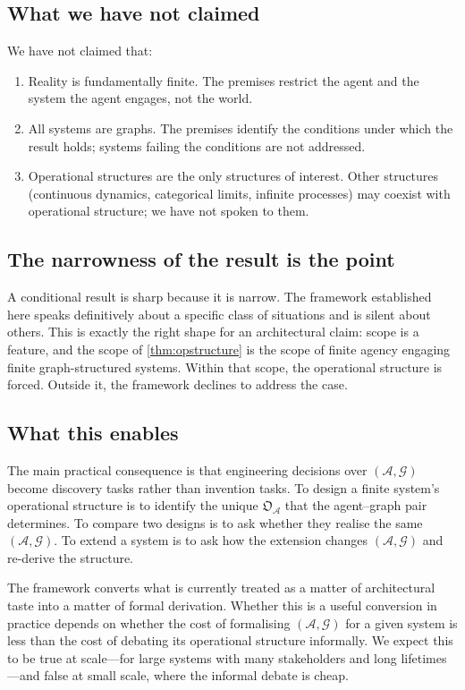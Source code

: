 \documentclass[11pt,twocolumn,a4paper]{article}
\theoremstyle{thmstyle}
\theoremstyle{definition}
\theoremstyle{remark}
\newcommand{\Graph}{\mathcal{G}}
\newcommand{\Agent}{\mathcal{A}}
\newcommand{\OpStr}{\mathfrak{O}}
\begin{document}
\subsection{What we have not claimed}

We have not claimed that:
\begin{enumerate}[nosep,leftmargin=*]
\item Reality is fundamentally finite. The premises restrict the
agent and the system the agent engages, not the world.
\item All systems are graphs. The premises identify the conditions
under which the result holds; systems failing the conditions are
not addressed.
\item Operational structures are the only structures of interest.
Other structures (continuous dynamics, categorical limits, infinite
processes) may coexist with operational structure; we have not
spoken to them.
\end{enumerate}

\subsection{The narrowness of the result is the point}

A conditional result is sharp because it is narrow. The framework
established here speaks definitively about a specific class of
situations and is silent about others. This is exactly the right
shape for an architectural claim: scope is a feature, and the scope
of \cref{thm:opstructure} is the scope of finite agency engaging
finite graph-structured systems. Within that scope, the operational
structure is forced. Outside it, the framework declines to address
the case.

\subsection{What this enables}

The main practical consequence is that engineering decisions over
$(\Agent, \Graph)$ become discovery tasks rather than invention
tasks. To design a finite system's operational structure is to
identify the unique $\OpStr_\Agent$ that the agent--graph pair
determines. To compare two designs is to ask whether they realise
the same $(\Agent, \Graph)$. To extend a system is to ask how the
extension changes $(\Agent, \Graph)$ and re-derive the structure.

The framework converts what is currently treated as a matter of
architectural taste into a matter of formal derivation. Whether
this is a useful conversion in practice depends on whether the cost
of formalising $(\Agent, \Graph)$ for a given system is less than
the cost of debating its operational structure informally. We
expect this to be true at scale---for large systems with many
stakeholders and long lifetimes---and false at small scale, where
the informal debate is cheap.
\end{document}
